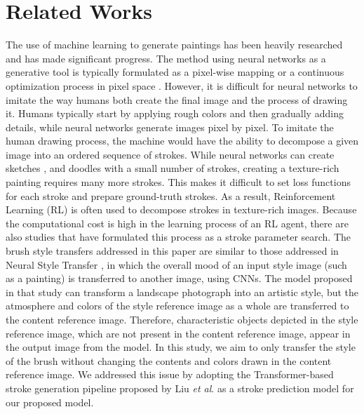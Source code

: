\documentclass{mva_style}
\begin{document}
\section{Related Works}
The use of machine learning to generate paintings has been heavily researched 
and has made significant progress. The method using neural networks as a 
generative tool is typically formulated as a pixel-wise mapping \cite{PerceptualLosses} 
or a continuous optimization process in pixel space \cite{ImageStyleTransfer}.
However, it is difficult for neural networks to imitate the way humans both 
create the final image and the process of drawing it. Humans typically start 
by applying rough colors and then gradually adding details, while neural 
networks generate images pixel by pixel. To imitate the human drawing 
process, the machine would have the ability to decompose a given image into 
an ordered sequence of strokes. While neural networks can create sketches 
\cite{DBLP:journals/corr/HaE17}, \cite{DBLP:journals/corr/abs-1805-00247} 
and doodles \cite{DBLP:journals/corr/abs-1810-05977} with a small number of 
strokes, creating a texture-rich painting requires many more strokes.
This makes it difficult to set loss functions for each stroke and prepare 
ground-truth strokes. As a result, Reinforcement Learning (RL) is often used 
to decompose strokes in texture-rich images. \cite{DBLP:journals/corr/abs-1804-01118, DBLP:journals/corr/abs-1206-4634, Huang_2019_ICCV}
Because the computational cost is high in the learning process of an RL agent, 
there are also studies that have formulated this process as a stroke 
parameter search. \cite{PaintTransformer}
The brush style transfers addressed in this paper are similar to those 
addressed in Neural Style Transfer \cite{ImageStyleTransfer}, in which the 
overall mood of an input style image (such as a painting) is transferred to 
another image, using CNNs. The model proposed in that study can transform a 
landscape photograph into an artistic style, but the atmosphere and colors of 
the style reference image as a whole are transferred to the content reference 
image. Therefore, characteristic objects depicted in the style reference 
image, which are not present in the content reference image, appear in the 
output image from the model. 
In this study, we aim to only transfer the style of the brush without changing 
the contents and colors drawn in the content reference image. We addressed 
this issue by adopting the Transformer-based stroke generation pipeline 
proposed by Liu \textit{et al}.\cite{PaintTransformer} as a stroke prediction 
model for our proposed model.
\end{document}
